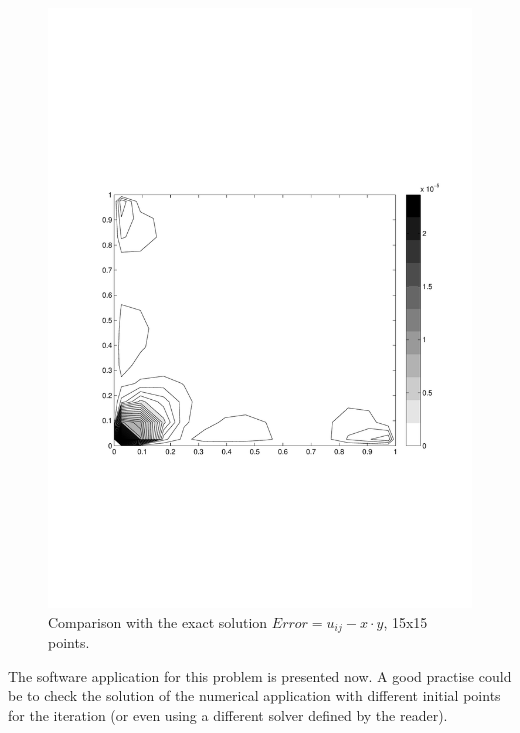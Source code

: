 \begin{multicols}{2}
\begin{figure}[H]
\centering
\includegraphics[scale=0.45, trim = 30mm 75mm 15mm 70mm, clip]{./Figures/3-BVP/error_15.pdf}
\caption{Comparison with the exact solution $Error=u_{ij}-x\cdot y$, 15x15
points. }
\end{figure}

\end{multicols}



The software application for this problem is presented now. A good practise
could be to check the solution of the numerical application with different
initial points for the iteration (or even using a different solver defined by
the reader).\\

